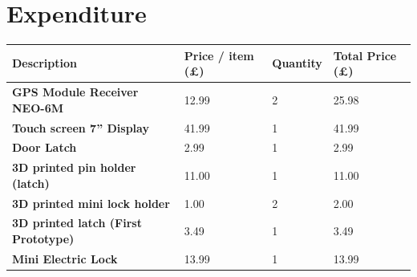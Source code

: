 \documentclass[11pt,landscape]{article}
\begin{document}
\section{Expenditure}
\begin{table}[H]
    \begin{center}
        
    \begin{tabular}{|l|l|l|l|}
        \hline
    \textbf{Description}                                          & \textbf{Price / item (£)} & \textbf{Quantity} & \textbf{Total Price (£)}          \\ \hline
    \textbf{GPS Module Receiver  NEO-6M}                                                       & 12.99                                         & 2                                     & 25.98                                                 \\ \hline
    \textbf{Touch screen 7'' Display}                                                          & 41.99                                         & 1                                     & 41.99                                                 \\ \hline
    \textbf{Door Latch}                                                                        & 2.99                                          & 1                                     & 2.99                                                  \\ \hline
    \textbf{3D printed pin holder (latch)}                                                     & 11.00                                         & 1                                     & 11.00                                                 \\ \hline
    \textbf{3D printed mini lock holder}                                                       & 1.00                                          & 2                                     & 2.00                                                  \\ \hline
    \textbf{3D printed latch (First Prototype)}                                                & 3.49                                          & 1                                     & 3.49                                                  \\ \hline
    \textbf{Mini Electric Lock}                                                                & 13.99                                         & 1                                     & 13.99                                                 \\ \hline

\end{tabular}
\end{center}
\end{table}
\end{document}
